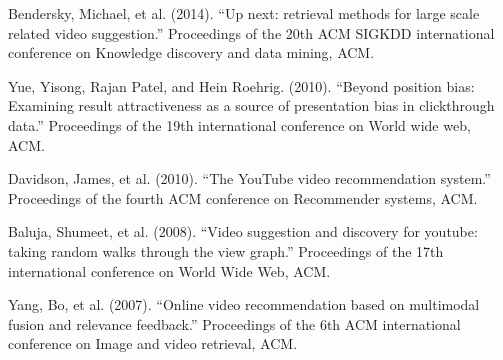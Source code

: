 \cleardoublepage
{}
{}
\begin{thebibliography}{99}

Bendersky, Michael, et al. (2014). ``Up next: retrieval methods for large scale related video suggestion.'' Proceedings of the 20th ACM SIGKDD international conference on Knowledge discovery and data mining, ACM.

Yue, Yisong, Rajan Patel, and Hein Roehrig. (2010). ``Beyond position bias: Examining result attractiveness as a source of presentation bias in clickthrough data.'' Proceedings of the 19th international conference on World wide web, ACM.

Davidson, James, et al. (2010). ``The YouTube video recommendation system.'' Proceedings of the fourth ACM conference on Recommender systems, ACM.

Baluja, Shumeet, et al. (2008). ``Video suggestion and discovery for youtube: taking random walks through the view graph.'' Proceedings of the 17th international conference on World Wide Web, ACM.

Yang, Bo, et al. (2007). ``Online video recommendation based on multimodal fusion and relevance feedback.'' Proceedings of the 6th ACM international conference on Image and video retrieval, ACM.

\end{thebibliography}